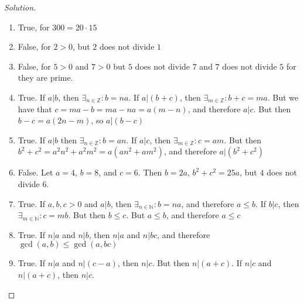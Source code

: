 \documentclass[crop=false,class=book,oneside]{standalone}
\begin{document}
            \begin{proof}[Solution]
                \
                \begin{enumerate}
                    \item True, for $300=20\cdot 15$
                    \item False, for $2>0$, but $2$ does not divide
                        $1$
                    \item False, for $5>0$ and $7>0$ but $5$ does
                        not divide $7$ and $7$ does not
                        divide $5$ for they are prime.
                    \item True. If ${a}\vert{b}$, then
                        $\exists_{n\in\mathbb{Z}}:b=na$. If
                        ${a}\vert{(b+c)}$, then
                        $\exists_{m\in\mathbb{Z}}:b+c=ma$. But we
                        have that $c=ma-b=ma-na=a(m-n)$,
                        and therefore ${a}\vert{c}$. But then
                        $b-c=a(2n-m)$, so ${a}\vert{(b-c)}$
                    \item True. If ${a}\vert{b}$ then
                        $\exists_{n\in\mathbb{Z}}:b=an$.
                        If ${a}\vert{c}$, then
                        $\exists_{m\in\mathbb{Z}}:c=am$. But then
                        $b^{2}+c^{2}=a^{2}n^{2}+a^{2}m^{2}%
                         =a(an^{2}+am^{2})$, and therefore
                        ${a}\vert{(b^{2}+c^{2})}$
                    \item False. Let $a=4$, $b=8$, and $c=6$.
                        Then $b=2a$, $b^{2}+c^{2}=25a$, but $4$
                        does not divide $6$.
                    \item True. If $a,b,c>0$ and ${a}\vert{b}$,
                        then $\exists_{n\in\mathbb{N}}:b=na$,
                        and therefore $a\leq b$. If
                        ${b}\vert{c}$, then
                        $\exists_{m\in\mathbb{N}}:c=mb$. But then
                        $b\leq c$. But $a\leq b$, and therefore
                        $a\leq c$
                    \item True. If ${n}\vert{a}$ and ${n}\vert{b}$,
                        then ${n}\vert{a}$ and ${n}\vert{bc}$, and
                        therefore $\gcd(a,b)\leq\gcd(a,bc)$
                    \item True. If ${n}\vert{a}$ and
                        ${n}\vert{(c-a)}$, then ${n}\vert{c}$. But
                        then ${n}\vert{(a+c)}$. If ${n}\vert{c}$
                        and ${n}\vert{(a+c)}$, then ${n}\vert{c}$.

\end{enumerate}
\end{proof}
\end{document}
